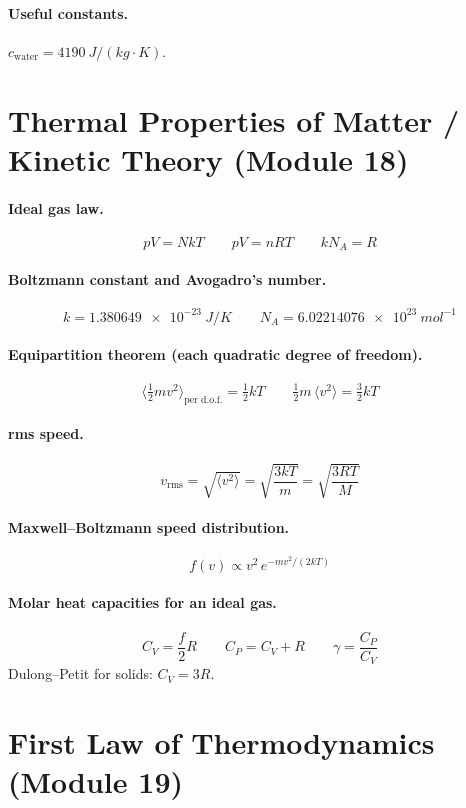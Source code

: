 \documentclass[11pt]{article}
\begin{document}
\paragraph{Useful constants.} $c_{\text{water}} = \SI{4190}{J/(kg\cdot K)}$.

\section*{Thermal Properties of Matter / Kinetic Theory (Module 18)}

\paragraph{Ideal gas law.}
\[
pV = N k T
\qquad
pV = n R T
\qquad
k N_{A} = R
\]

\paragraph{Boltzmann constant and Avogadro's number.}
\[
k = \SI{1.380649e-23}{J/K}
\qquad
N_{A} = \SI{6.02214076e23}{mol^{-1}}
\]

\paragraph{Equipartition theorem (each quadratic degree of freedom).}
\[
\langle \tfrac{1}{2} m v^{2}\rangle_{\text{per d.o.f.}} = \tfrac{1}{2} k T
\qquad
\tfrac{1}{2} m\,\langle v^{2}\rangle = \tfrac{3}{2} k T
\]

\paragraph{rms speed.}
\[
v_{\text{rms}} = \sqrt{\langle v^{2}\rangle} = \sqrt{\frac{3 k T}{m}} = \sqrt{\frac{3 R T}{M}}
\]

\paragraph{Maxwell--Boltzmann speed distribution.}
\[
f(v) \propto v^{2}\, e^{-m v^{2}/(2 k T)}
\]

\paragraph{Molar heat capacities for an ideal gas.}
\[
C_{V} = \frac{f}{2} R
\qquad
C_{P} = C_{V} + R
\qquad
\gamma = \frac{C_{P}}{C_{V}}
\]
Dulong--Petit for solids: $C_{V} = 3R$.

\section*{First Law of Thermodynamics (Module 19)}
\end{document}
